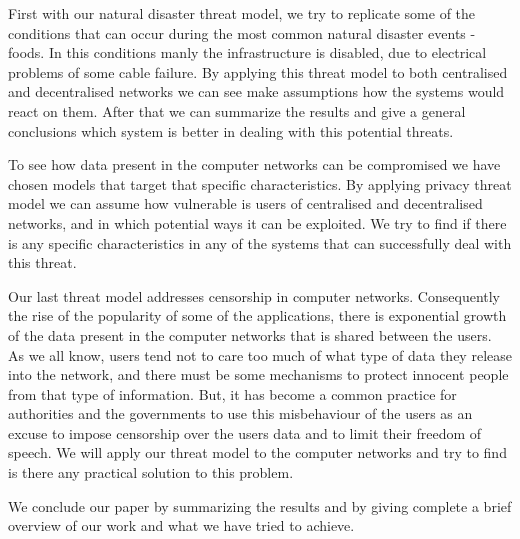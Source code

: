 First with our natural disaster threat model, we try to replicate some of the conditions that can occur during the most common natural disaster events -  foods. In this conditions manly the infrastructure is disabled, due to electrical problems of some cable failure. By applying this threat model to both centralised and decentralised networks we can see make assumptions how the systems would react on them. After that we can summarize the results and give a general conclusions which system is better in dealing with this potential threats.

To see how data present in the computer networks can be compromised we have chosen models that target that specific characteristics. By applying privacy threat model we can assume how vulnerable is  users of centralised and decentralised networks, and in which potential ways it can be exploited. We try to find if there is any specific characteristics in any of the systems that can successfully deal with this threat.

Our last threat model addresses censorship in computer networks. Consequently the rise of the popularity of some of the applications, there is exponential growth of the data present in the computer networks that is shared between the users. As we all know, users tend not to care too much of what type of data they release into the network, and there must be some mechanisms to protect innocent people from that type of information. But, it has become a common practice for authorities and the governments to use this misbehaviour of the users as an excuse to 	impose censorship over the users data and to limit their freedom of speech. We will apply our threat model to the computer networks and try to find is there any practical solution to this problem. 

We conclude our paper by summarizing the results and by giving complete a brief overview of our work and what we have tried to achieve.
%
%
%
%
%
%
%
%
%
%
